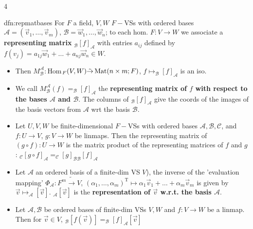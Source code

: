 \documentclass[landscape, 8pt]{extarticle}
\begin{document}
\begin{multicols*}{4}
		
		\begin{dfn}{dfn:repmatbases}{ }
			For $F$ a field, $V, W$ $F-$VSs with ordered bases $\mathcal{A} = (\vec{v}_1, \dots, \vec{v}_m)$, $\mathcal{B} = \vec{w}_1, \dots, \vec{w}_n$; to each hom. $F: V \to W$ we associate a \textbf{representing matrix} $_\mathcal{B}[f]_\mathcal{A}$ with entries $a_{ij}$ defined by $f(v_j) = a_{1j}\vec{w}_1 + \dots + a_{nj}\vec{w}_n \in W$.
			\begin{itemize}
				\item Then $M_\mathcal{B}^\mathcal{A}:$Hom$_F(V, W) \tilde{\to}\operatorname{Mat}(n\times m; F)$, $f \mapsto _\mathcal{B}[f]_\mathcal{A}$ is an iso.
				\item We call $M_\mathcal{B}^\mathcal{A}(f)=_\mathcal{B}[f]_\mathcal{A}$ the \textbf{representing matrix of $f$ with respect to the bases $\mathcal{A}$ and $\mathcal{B}$}. The columns of $_\mathcal{B}[f]_\mathcal{A}$ give the coords of the images of the basis vectors from $\mathcal{A}$ wrt the basis $\mathcal{B}$.
				\item Let $U, V, W$ be finite-dimensional $F-$VSs with ordered bases $\mathcal{A, B, C}$, and $f:U \to V$, $g: V \to W$ be linmaps. Then the representing matrix of $(g \circ f) : U \to W$ is the matrix product of the representing matrices of $f$ and $g$: $_\mathcal{C}[g 	\circ f]_\mathcal{A} = _\mathcal{C}[g]_{\mathcal{B}\mathcal{B}}[f]_\mathcal{A}$ 
				\item Let $\mathcal{A}$ an ordered basis of a finite-dim VS $V$), the inverse of the 'evaluation mapping' $\Phi_\mathcal{A} : F^m \tilde{\to} V$, $(\alpha_1, \dots, \alpha_m)^\text{T} \mapsto \alpha_1 \vec{v}_1 + \dots + \alpha_m \vec{v}_m$ is given by $\vec{v} \mapsto _\mathcal{A}[\vec{v}]$. $_\mathcal{A}[\vec{v}]$ is the \textbf{representation of $\vec{v}$ w.r.t. the basis $\mathcal{A}$}.
				\item Let $\mathcal{A, B}$ be ordered bases of finite-dim VSs $V, W$ and $f: V \to W$ be a linmap. Then for $\vec{v} \in V$, $_\mathcal{B}[f(\vec{v})] = _\mathcal{B}[f]_{\mathcal{A}}[\vec{v}]$
			\end{itemize}
			
			
		\end{dfn}
		

\end{multicols*}
\end{document}
